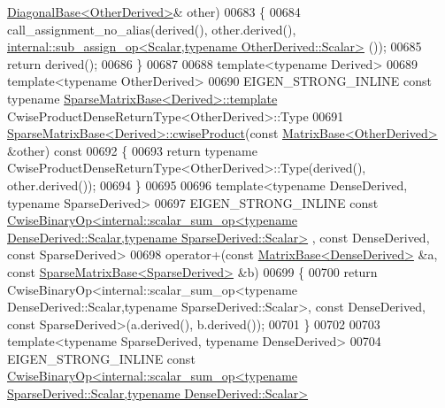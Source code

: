\begin{DoxyCode}
      \hyperlink{class_eigen_1_1_diagonal_base}{DiagonalBase<OtherDerived>}& other)
00683 \{
00684   call\_assignment\_no\_alias(derived(), other.derived(), 
      \hyperlink{struct_eigen_1_1internal_1_1sub__assign__op}{internal::sub\_assign\_op<Scalar,typename OtherDerived::Scalar>}
      ());
00685   \textcolor{keywordflow}{return} derived();
00686 \}
00687     
00688 \textcolor{keyword}{template}<\textcolor{keyword}{typename} Derived>
00689 \textcolor{keyword}{template}<\textcolor{keyword}{typename} OtherDerived>
00690 EIGEN\_STRONG\_INLINE \textcolor{keyword}{const} \textcolor{keyword}{typename} \hyperlink{group___sparse_core___module_class_eigen_1_1_sparse_matrix_base}{SparseMatrixBase<Derived>::template} 
      CwiseProductDenseReturnType<OtherDerived>::Type
00691 \hyperlink{group___sparse_core___module_class_eigen_1_1_sparse_matrix_base}{SparseMatrixBase<Derived>::cwiseProduct}(\textcolor{keyword}{const} 
      \hyperlink{group___core___module_class_eigen_1_1_matrix_base}{MatrixBase<OtherDerived>} &other)\textcolor{keyword}{ const}
00692 \textcolor{keyword}{}\{
00693   \textcolor{keywordflow}{return} \textcolor{keyword}{typename} CwiseProductDenseReturnType<OtherDerived>::Type(derived(), other.derived());
00694 \}
00695 
00696 \textcolor{keyword}{template}<\textcolor{keyword}{typename} DenseDerived, \textcolor{keyword}{typename} SparseDerived>
00697 EIGEN\_STRONG\_INLINE \textcolor{keyword}{const} 
      \hyperlink{group___core___module_class_eigen_1_1_cwise_binary_op}{CwiseBinaryOp<internal::scalar\_sum\_op<typename DenseDerived::Scalar,typename SparseDerived::Scalar>}
      , \textcolor{keyword}{const} DenseDerived, \textcolor{keyword}{const} SparseDerived>
00698 operator+(\textcolor{keyword}{const} \hyperlink{group___core___module_class_eigen_1_1_matrix_base}{MatrixBase<DenseDerived>} &a, \textcolor{keyword}{const} 
      \hyperlink{group___sparse_core___module_class_eigen_1_1_sparse_matrix_base}{SparseMatrixBase<SparseDerived>} &b)
00699 \{
00700   \textcolor{keywordflow}{return} CwiseBinaryOp<internal::scalar\_sum\_op<typename DenseDerived::Scalar,typename
       SparseDerived::Scalar>, \textcolor{keyword}{const} DenseDerived, \textcolor{keyword}{const} SparseDerived>(a.derived(), b.derived());
00701 \}
00702 
00703 \textcolor{keyword}{template}<\textcolor{keyword}{typename} SparseDerived, \textcolor{keyword}{typename} DenseDerived>
00704 EIGEN\_STRONG\_INLINE \textcolor{keyword}{const} 
      \hyperlink{group___core___module_class_eigen_1_1_cwise_binary_op}{CwiseBinaryOp<internal::scalar\_sum\_op<typename SparseDerived::Scalar,typename DenseDerived::Scalar>}

\end{DoxyCode}
